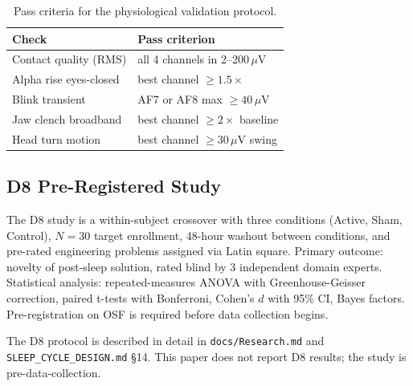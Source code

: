 \begin{table}[h]
\centering
\small
\begin{tabular}{ll}
\toprule
Check & Pass criterion \\
\midrule
Contact quality (RMS) & all 4 channels in 2--200\,$\mu$V \\
Alpha rise eyes-closed & best channel $\geq 1.5\times$ \\
Blink transient & AF7 or AF8 max $\geq 40\,\mu$V \\
Jaw clench broadband & best channel $\geq 2\times$ baseline \\
Head turn motion & best channel $\geq 30\,\mu$V swing \\
\bottomrule
\end{tabular}
\caption{Pass criteria for the physiological validation protocol.}
\label{tab:pass-criteria}
\end{table}

\subsection{D8 Pre-Registered Study}


The D8 study is a within-subject crossover with three conditions (Active,
Sham, Control), $N = 30$ target enrollment, 48-hour washout between
conditions, and pre-rated engineering problems assigned via Latin square.
Primary outcome: novelty of post-sleep solution, rated blind by 3
independent domain experts. Statistical analysis: repeated-measures ANOVA
with Greenhouse-Geisser correction, paired t-tests with Bonferroni, Cohen's
$d$ with 95\% CI, Bayes factors. Pre-registration on OSF
\citep{osf2024} is required before data collection begins.

The D8 protocol is described in detail in \texttt{docs/Research.md} and
\texttt{SLEEP\_CYCLE\_DESIGN.md} §14. This paper does not report D8 results;
the study is pre-data-collection.
